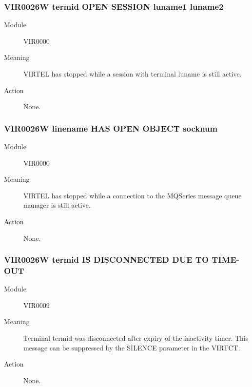 \documentclass[letterpaper,10pt,english]{sphinxmanual}
\begin{document}
\subsubsection{VIR0026W termid OPEN SESSION luname1 \textendash{} luname2}
\label{\detokenize{messages:vir0026w-termid-open-session-luname1-luname2}}\begin{description}
\item[{Module}] \leavevmode
VIR0000

\item[{Meaning}] \leavevmode
VIRTEL has stopped while a session with terminal luname is still active.

\item[{Action}] \leavevmode
None.

\end{description}


\subsubsection{VIR0026W linename HAS OPEN OBJECT socknum}
\label{\detokenize{messages:vir0026w-linename-has-open-object-socknum}}\begin{description}
\item[{Module}] \leavevmode
VIR0000

\item[{Meaning}] \leavevmode
VIRTEL has stopped while a connection to the MQSeries message queue manager is still active.

\item[{Action}] \leavevmode
None.

\end{description}


\subsubsection{VIR0026W termid IS DISCONNECTED DUE TO TIME-OUT}
\label{\detokenize{messages:vir0026w-termid-is-disconnected-due-to-time-out}}\begin{description}
\item[{Module}] \leavevmode
VIR0009

\item[{Meaning}] \leavevmode
Terminal termid was disconnected after expiry of the inactivity timer. This message can be suppressed by the SILENCE parameter in the VIRTCT.

\item[{Action}] \leavevmode
None.

\end{description}
\end{document}
